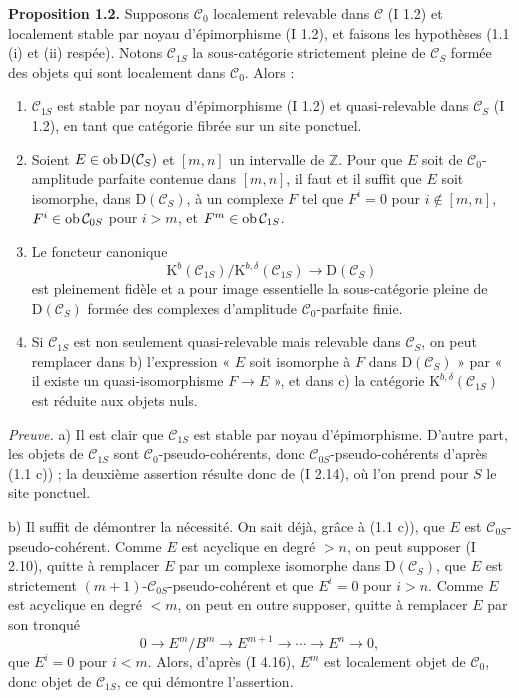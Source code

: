 \documentclass[11pt]{article}
\begin{document}
\textbf{Proposition 1.2.} Supposons $\mathcal C_0$ localement relevable dans $\mathcal C$ (I 1.2) et localement stable par noyau d'épimorphisme (I 1.2), et faisons les hypothèses (1.1 (i) et (ii) respée). Notons $\mathcal C_{1S}$ la sous-catégorie strictement pleine de $\mathcal C_S$ formée des objets qui sont localement dans $\mathcal C_0$. Alors :
\begin{enumerate}[label=\alph*)]
\item $\mathcal C_{1S}$ est stable par noyau d'épimorphisme (I 1.2) et quasi-relevable dans $\mathcal C_S$ (I 1.2), en tant que catégorie fibrée sur un site ponctuel.
\item Soient $E\in\operatorname{ob}\mathrm D(\mathcal C_S)$ et $[m,n]$ un intervalle de $\mathbb Z$. Pour que $E$ soit de $\mathcal C_0$-amplitude parfaite contenue dans $[m,n]$, il faut et il suffit que $E$ soit isomorphe, dans $\mathrm D(\mathcal C_S)$, à un complexe $F$ tel que $F^i=0$ pour $i\notin[m,n]$, $F^i\in\operatorname{ob}\mathcal C_{0S}$ pour $i>m$, et $F^m\in\operatorname{ob}\mathcal C_{1S}$.
\item Le foncteur canonique
\[
\mathrm K^b(\mathcal C_{1S})/\mathrm K^{b,\delta}(\mathcal C_{1S})
\longrightarrow \mathrm D(\mathcal C_S)
\]
est pleinement fidèle et a pour image essentielle la sous-catégorie pleine de $\mathrm D(\mathcal C_S)$ formée des complexes d'amplitude $\mathcal C_0$-parfaite finie.
\item Si $\mathcal C_{1S}$ est non seulement quasi-relevable mais relevable dans $\mathcal C_S$, on peut remplacer dans b) l'expression « $E$ soit isomorphe à $F$ dans $\mathrm D(\mathcal C_S)$ » par « il existe un quasi-isomorphisme $F\to E$ », et dans c) la catégorie $\mathrm K^{b,\delta}(\mathcal C_{1S})$ est réduite aux objets nuls.
\end{enumerate}

\emph{Preuve.} a) Il est clair que $\mathcal C_{1S}$ est stable par noyau d'épimorphisme. D'autre part, les objets de $\mathcal C_{1S}$ sont $\mathcal C_0$-pseudo-cohérents, donc $\mathcal C_{0S}$-pseudo-cohérents d'après (1.1 c)) ; la deuxième assertion résulte donc de (I 2.14), où l'on prend pour $S$ le site ponctuel.

b) Il suffit de démontrer la nécessité. On sait déjà, grâce à (1.1 c)), que $E$ est $\mathcal C_{0S}$-pseudo-cohérent. Comme $E$ est acyclique en degré $>n$, on peut supposer (I 2.10), quitte à remplacer $E$ par un complexe isomorphe dans $\mathrm D(\mathcal C_S)$, que $E$ est strictement $(m+1)$-$\mathcal C_{0S}$-pseudo-cohérent et que $E^i=0$ pour $i>n$. Comme $E$ est acyclique en degré $<m$, on peut en outre supposer, quitte à remplacer $E$ par son tronqué
\[
0\longrightarrow E^m/B^m\longrightarrow E^{m+1}\longrightarrow\cdots\longrightarrow E^n\longrightarrow0,
\]
que $E^i=0$ pour $i<m$. Alors, d'après (I 4.16), $E^m$ est localement objet de $\mathcal C_0$, donc objet de $\mathcal C_{1S}$, ce qui démontre l'assertion.
\end{document}

